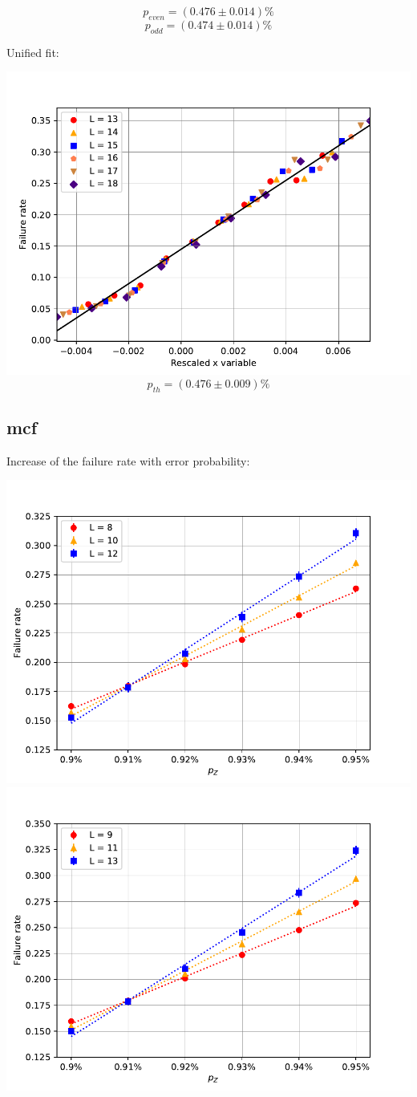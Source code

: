\documentclass[pra]{revtex4-1}
\begin{document}
\[  p_{even} = (0.476 \pm 0.014)\% \]
\[  p_{odd} = (0.474 \pm 0.014)\% \]
\clearpage 

Unified fit: \begin{center} 

\includegraphics[width=.9\textwidth]{../graphs-paper2/mab-dephasing-rescaled.pdf}
\[  p_{th} = (0.476 \pm 0.009)\% \] \end{center}
\clearpage 

\subsection*{mcf}
\noindent Increase of the failure rate with error probability: 
  
\includegraphics[width=.49\textwidth]{../graphs-paper2/mcf-dephasing-even.pdf}
\includegraphics[width=.49\textwidth]{../graphs-paper2/mcf-dephasing-odd.pdf}
\end{document}
